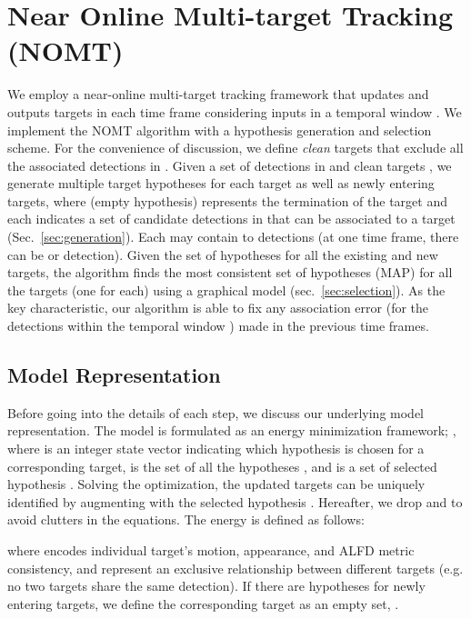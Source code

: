 \documentclass[10pt,twocolumn,letterpaper]{article}
\begin{document}
\section{Near Online Multi-target Tracking (NOMT)}
\label{sec:method}
We employ a near-online multi-target tracking framework that updates and outputs targets  in each time frame considering inputs in a temporal window . We implement the NOMT algorithm with a hypothesis generation and selection scheme. 
For the convenience of discussion, we define \emph{clean} targets  that exclude all the associated detections in .
Given a set of detections in  and clean targets , we generate multiple target hypotheses  for each target  as well as newly entering targets, where  (empty hypothesis) represents the termination of the target and each  indicates a set of candidate detections in  that can be associated to a target  (Sec.~\ref{sec:generation}). Each  may contain  to  detections (at one time frame, there can be  or  detection).
Given the set of hypotheses for all the existing and new targets, the algorithm finds the most consistent set of hypotheses (MAP) for all the targets (one for each) using a graphical model (sec.~\ref{sec:selection}). As the key characteristic, our algorithm is able to fix any association error (for the detections within the temporal window  ) made in the previous time frames.

\subsection{Model Representation}
\label{sec:model}

Before going into the details of each step, we discuss our underlying model representation. The model is formulated as an energy minimization framework; , where  is an integer state vector indicating which hypothesis is chosen for a corresponding target, 
 is the set of all the hypotheses , and  is a set of selected hypothesis . Solving the optimization, the updated targets  can be uniquely identified by augmenting  with the selected hypothesis . Hereafter, we drop  and  to avoid clutters in the equations. The energy is defined as follows:

{\footnotesize

}
where  encodes individual target's motion, appearance, and ALFD metric consistency, and  represent an exclusive relationship between different targets (e.g. no two targets share the same detection). If there are hypotheses for newly entering targets, we define the corresponding target as an empty set, .
\end{document}
